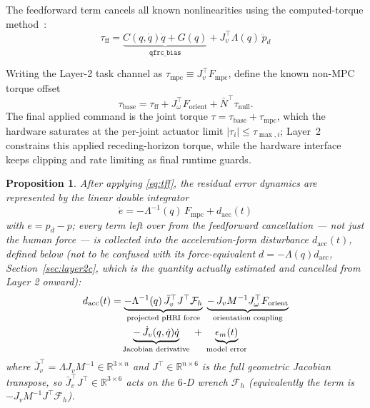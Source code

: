 \documentclass[journal]{IEEEtran}
\newtheorem{proposition}{Proposition}
\newcommand{\Laminv}{\Lambda^{-1}(q)}
\newcommand{\Fmpc}{F_{\text{mpc}}}
\newcommand{\Nbar}{\bar{N}}
\begin{document}
The feedforward term cancels all known nonlinearities using the
computed-torque method~\cite{siciliano2009robotics}:
\begin{equation}\label{eq:tff}
  \tau_{\text{ff}} = \underbrace{C(q,\dot{q})\dot{q}+G(q)}_{\texttt{qfrc\_bias}}
                   + J_v^\top\Lambda(q)\,\ddot{p}_d
\end{equation}

Writing the Layer-2 task channel as $\tau_{\text{mpc}}\equiv J_v^\top\Fmpc$,
define the known non-MPC torque offset
\[
  \tau_{\text{base}}=
  \tau_{\text{ff}}+J_\omega^\top F_{\text{orient}}+\Nbar^\top\tau_{\text{null}}.
\]
The final applied command is the joint torque
$\tau = \tau_{\text{base}}+\tau_{\text{mpc}}$, which the hardware saturates at
the per-joint actuator limit $|\tau_i|\leq\tau_{\max,i}$; Layer~2 constrains
this applied receding-horizon torque, while the hardware interface keeps
clipping and rate limiting as final runtime guards.

\begin{proposition}\label{prop:doubleint}
After applying \eqref{eq:tff}, the residual error dynamics are represented by
the linear double integrator
\begin{equation}\label{eq:errordyn}
  \ddot{e} = -\Laminv\,\Fmpc + d_{\text{acc}}(t)
\end{equation}
with $e=p_d-p$; every term left over from the feedforward cancellation ---
not just the human force --- is collected into the \emph{acceleration}-form
disturbance $d_{\text{acc}}(t)$, defined below (not to be confused with its
force-equivalent $d=-\Lambda(q)d_{\text{acc}}$, Section~\ref{sec:layer2c},
which is the quantity actually estimated and cancelled from Layer 2
onward):
\begin{align}\label{eq:dist}
  d_{\text{acc}}(t) &= \underbrace{-\Laminv\,\bar{J}_v^\top J^\top\mathcal{F}_h}_{%
           \text{projected pHRI force}}
          \;\underbrace{-\,J_vM^{-1}J_\omega^\top F_{\text{orient}}}_{%
           \text{orientation coupling}}\notag\\
        &\quad\underbrace{-\,\dot{J}_v(q,\dot{q})\dot{q}}_{%
           \text{Jacobian derivative}}
          \;+\;\underbrace{\epsilon_m(t)}_{\text{model error}}
\end{align}
where $\bar{J}_v^\top=\Lambda J_vM^{-1}\in\mathbb{R}^{3\times n}$ and
$J^\top\in\mathbb{R}^{n\times 6}$ is the full geometric Jacobian transpose,
so $\bar{J}_v^\top J^\top\in\mathbb{R}^{3\times 6}$ acts on the $6$-D wrench
$\mathcal{F}_h$ (equivalently the term is $-J_vM^{-1}J^\top\mathcal{F}_h$).
\end{proposition}
\end{document}
